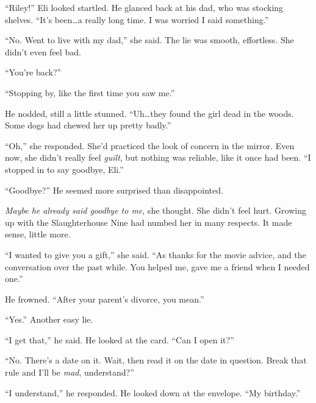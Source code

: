 ``Riley!''  Eli looked startled.  He glanced back at his dad, who was stocking shelves.  ``It's been\ldots a really long time.  I was worried I said something.''



``No.  Went to live with my dad,'' she said.  The lie was smooth, effortless.  She didn't even feel bad.



``You're back?''



``Stopping by, like the first time you saw me.''



He nodded, still a little stunned.  ``Uh\ldots they found the girl dead in the woods.  Some dogs had chewed her up pretty badly.''



``Oh,'' she responded.  She'd practiced the look of concern in the mirror.  Even now, she didn't really feel \emph{guilt}, but nothing was reliable, like it once had been.  ``I stopped in to say goodbye, Eli.''



``Goodbye?''  He seemed more surprised than disappointed.



\emph{Maybe he already said goodbye to me}, she thought.  She didn't feel hurt.  Growing up with the Slaughterhouse Nine had numbed her in many respects.  It made sense, little more.



``I wanted to give you a gift,'' she said.  ``As thanks for the movie advice, and the conversation over the past while.  You helped me, gave me a friend when I needed one.''



He frowned.  ``After your parent's divorce, you mean.''



``Yes.''  Another easy lie.



``I get that,'' he said.  He looked at the card.  ``Can I open it?''



``No.  There's a date on it.  Wait, then read it on the date in question.  Break that rule and I'll be \emph{mad}, understand?''



``I understand,'' he responded.  He looked down at the envelope.  ``My birthday.''



